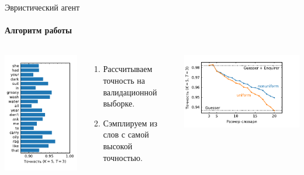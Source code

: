 \documentclass[aspectratio=169]{beamer}
\newcommand{\imgscale}{0.8}
\begin{document}
\begin{frame}{Эвристический агент}
    \framesubtitle{Алгоритм работы}
    \begin{columns}[b]
        \includegraphics[height=.8\textheight]{../plots/word_scores.pdf}
        \begin{enumerate}
            \item Рассчитываем точность на валидационной выборке.
            \item Сэмплируем из слов с самой высокой точностью.
        \end{enumerate}
        \begin{center}
            \includegraphics[scale=\imgscale]{../plots/heuristic.pdf}
        \end{center}
    \end{columns}
\end{frame}
\end{document}
